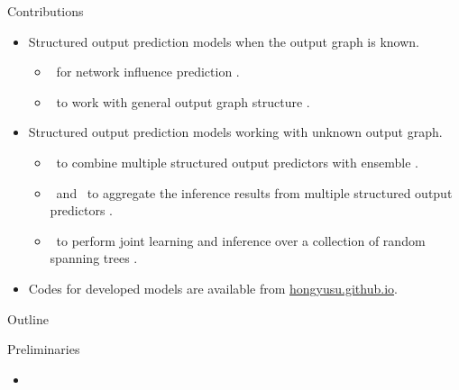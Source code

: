 \documentclass[first=dgreen,second=purple,logo=yellowexc]{aaltoslides}
\begin{document}
%
\begin{frame}{Contributions}
	\begin{itemize}\footnotesize
		\item Structured output prediction models when the output graph is known.
		\begin{itemize}\footnotesize
			\item \spin\ for network influence prediction \cite{su14structured}.
			\item \mmcrf\ to work with general output graph structure \cite{su10structured}.
		\end{itemize}
		\item Structured output prediction models working with unknown output graph.
		\begin{itemize}\footnotesize
			\item \mve\ to combine multiple structured output predictors with ensemble \cite{su11mutitask}.
			\item \amm\ and \mam\ to aggregate the inference results from multiple structured output predictors \cite{su2013multilabelacml,su15multilabel}.
			\item \rta\ to perform joint learning and inference over a collection of random spanning trees \cite{su14multilabelnips}.
		\end{itemize}
		\item Codes for developed models are available from \href{http://hongyusu.github.io}{hongyusu.github.io}.
	\end{itemize}
\end{frame}


%
\begin{frame}{Outline}
\end{frame}

%
\begin{frame}{Preliminaries}
	\begin{itemize}\footnotesize
		\item 
	\end{itemize}
\end{frame}
\end{document}

